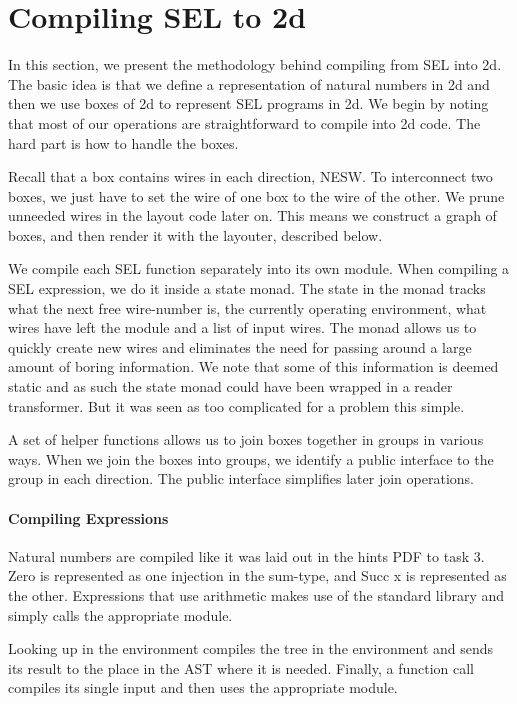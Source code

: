 
\section{Compiling SEL to 2d}
\label{sec:compiling-sel-2d}

In this section, we present the methodology behind compiling from SEL
into 2d. The basic idea is that we define a representation of natural
numbers in 2d and then we use boxes of 2d to represent SEL programs in
2d. We begin by noting that most of our operations are straightforward
to compile into 2d code. The hard part is how to handle the boxes.

Recall that a box contains wires in each direction, NESW. To
interconnect two boxes, we just have to set the wire of one box to the
wire of the other. We prune unneeded wires in the layout code later
on. This means we construct a graph of boxes, and then render it with
the layouter, described below.

We compile each SEL function separately into its own module. When
compiling a SEL expression, we do it inside a state monad. The state
in the monad tracks what the next free wire-number is, the currently
operating environment, what wires have left the module and a list of
input wires. The monad allows us to quickly create new wires and
eliminates the need for passing around a large amount of boring
information. We note that some of this information is deemed static
and as such the state monad could have been wrapped in a reader
transformer. But it was seen as too complicated for a problem this
simple.

A set of helper functions allows us to join boxes together in groups
in various ways. When we join the boxes into groups, we identify a
public interface to the group in each direction. The public interface
simplifies later join operations.


\paragraph{Compiling Expressions}
\label{sec:compiling-numbers}

Natural numbers are compiled like it was laid out in the hints PDF to
task 3. Zero is represented as one injection in the sum-type, and Succ
x is represented as the other. Expressions that use arithmetic makes
use of the standard library and simply calls the appropriate module.

Looking up in the environment compiles the tree in the environment and
sends its result to the place in the AST where it is needed. Finally,
a function call compiles its single input and then uses the
appropriate module.

